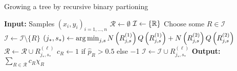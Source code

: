   \begin{algorithm}
    \caption{Growing a tree by recursive binary partioning} \label{alg:tree}
    \begin{algorithmic}[1]
      \State \textbf{Input:} Samples $(x_i, y_i)_{i = 1, \ldots, n}$
      \State $\mathcal{R} \gets \emptyset$ 
      \State $\mathcal{I} \gets \{ \mathbb{R} \}$ 
        \State Choose some $R \in \mathcal{I}$
        \State $\mathcal{I} \gets \mathcal{I} \setminus \{ R \}$
        \State $(j_*, s_*) \gets \operatorname*{arg\,min}_{j, s} N\left(R_{j,s}^{(1)}\right) Q\left(R_{j,s}^{(1)}\right) + 
          N\left(R_{j,s}^{(2)}\right) Q\left(R_{j,s}^{(2)}\right)$ 
            \State $\mathcal{R} \gets \mathcal{R} \cup R_{j_*, s_*}^{(\ell)}$
            \State $c_R \gets 1$ if $\hat{p}_R > \num{0.5}$ else \num{-1}
          \Else
            \State $\mathcal{I} \gets \mathcal{I} \cup R_{j_*, s_*}^{(\ell)}$
          \EndIf
        \EndFor
      \EndWhile
      \State \textbf{Output:} $\sum_{R \in \mathcal{R}} c_R \chi_R$
    \end{algorithmic}
  \end{algorithm}